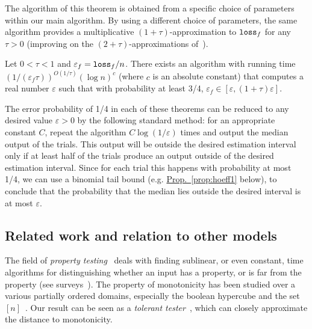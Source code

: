 \documentclass{acmsmall}
\newcommand{\Prop}[1]{\hyperref[prop:#1]{Prop.~\ref*{prop:#1}}} %
\newcommand{\loss}{{\tt loss}}
\newcommand{\eps}{\varepsilon}
\newcommand{\errorprob}{\eps}
\begin{document}
The algorithm of this theorem is obtained from a specific choice of parameters within
our main algorithm.  By using a different  choice of parameters, the same algorithm
provides a
multiplicative $(1+\tau)$-approximation to $\loss_f$ for any $\tau>0$ (improving
on the  $(2+\tau)$-approximations
of~\cite{PRR04,ACCL1}).

\begin{theorem} \label{thm:dist} Let $0<\tau < 1$ and $\eps_f=\loss_f/n$. 
There exists an algorithm with running time
$(1/(\eps_f\tau))^{O(1/\tau)}(\log n)^c$ (where $c$ is an absolute constant) that computes a real number $\eps$
such that with probability at least 3/4,  $\eps_f \in [\eps ,(1+\tau)\eps]$.
\end{theorem}

The error probability of 1/4  in each of these theorems can be reduced to any desired value $\errorprob>0$ by the following standard
method: for an appropriate constant $C$,  repeat the algorithm $C \log(1/\errorprob)$ times and output the median output of the trials.  This output will be outside
the desired estimation interval only if at least half of the trials produce an output outside of the desired estimation interval.    Since for each trial this happens
with probability at most 1/4, we can use a binomial tail bound
 (e.g. \Prop{hoeff1} below), to conclude that the probability that the median lies outside the desired interval
is at most $\errorprob$.

\subsection{Related work and relation to other models}

The field of \emph{property testing}~\cite{RS96,GGR98} deals with finding sublinear, or even constant,
time algorithms for distinguishing whether an input has a property,
or is far from the property (see surveys~\cite{FischerSurvey,RonSurvey,GoldreichSurvey}). The property
of monotonicity has been studied over a various partially ordered domains, especially
the boolean hypercube and the set $[n]$~\cite{GGLRS00,DGLRRS99,ELNRR02,HK03,ACCL1,PRR04,BGJRW09}. Our result
can be seen as a \emph{tolerant tester}~\cite{PRR04}, which can closely
approximate the distance to monotonicity.
\end{document}
